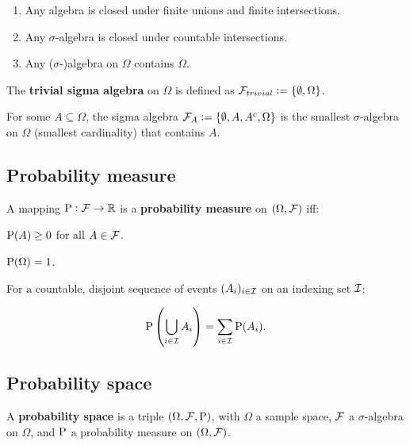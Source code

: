 \begin{remark}
    \begin{enumerate}
        \item Any algebra is closed under finite unions and finite intersections.
        \item Any $\sigma$-algebra is closed under countable intersections.
        \item Any ($\sigma$-)algebra on $\Omega$ contains $\Omega$.
    \end{enumerate}
\end{remark}

\begin{definition}
    The \textbf{trivial sigma algebra} on $\Omega$ is defined as $\FFF_{trivial} := \{ \emptyset, \Omega \}$.
\end{definition}

\begin{example}
    For some $A \subseteq \Omega$, the sigma algebra $\FFF_A := \{\emptyset, A, A^c , \Omega \}$ is the smallest $\sigma$-algebra on $\Omega$ (smallest cardinality) that contains $A$.
\end{example}

\subsection{Probability measure}

\begingroup\belowdisplayskip=-10pt
    \begin{definition}
        A mapping $\P: \FFF \to \RR$ is a \textbf{probability measure} on $(\Omega, \FFF)$ iff:\\
        \begin{enumerate*}
            \item $\P(A)\geq0$ for all $A\in\FFF$.
            \item $\P(\Omega) = 1$.
            \item For a countable, disjoint sequence of events $(A_i)_{i\in\III}$ on an indexing set $\III$: \\
        \end{enumerate*}
        \[
        \P\left(\bigcup_{i\in\III}A_i\right) = \sum_{i\in\III}\P(A_i)\textcolor{black}{.}
        \]
    \end{definition}
\endgroup

\begingroup\abovedisplayskip=-10pt 
\subsection{Probability space}
\endgroup
\begin{definition}
    A \textbf{probability space} is a triple $(\Omega, \FFF, \P)$, with $\Omega$ a sample space, $\FFF$ a $\sigma$-algebra on $\Omega$, and $\P$ a probability measure on $(\Omega, \FFF)$.
\end{definition}

